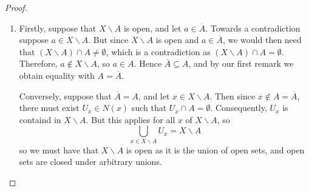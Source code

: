 \begin{proof}
\begin{enumerate}
        \item Firstly, suppose that $X\backslash A$ is open, and let $a \in \overline{A}$. Towards a contradiction suppose $a \in X\backslash A$. But since $X\backslash A$ is open and $a \in \overline{A}$, we would then need that $(X\backslash A) \cap A \neq \emptyset$, which is a contradiction as $(X\backslash A)\cap A = \emptyset$. Therefore, $a \notin X\backslash A$, so $a \in A$. Hence $\overline{A} \subseteq A$, and by our first remark we obtain equality with $A = \overline{A}$.

            Conversely, suppose that $\overline{A} = A$, and let $x \in X\backslash A$. Then since $x \notin A = \overline{A}$, there must exist $U_x \in N(x)$ such that $U_x \cap A = \emptyset$. Consequently, $U_x$ is containd in $X\backslash A$. But this applies for all $x$ of $X\backslash A$, so \begin{equation*}
                \bigcup_{x \in X\backslash A}U_x = X\backslash A
            \end{equation*}
            so we must have that $X\backslash A$ is open as it is the union of open sets, and open sets are closed under arbitrary unions.
    \end{enumerate}
\end{proof}



